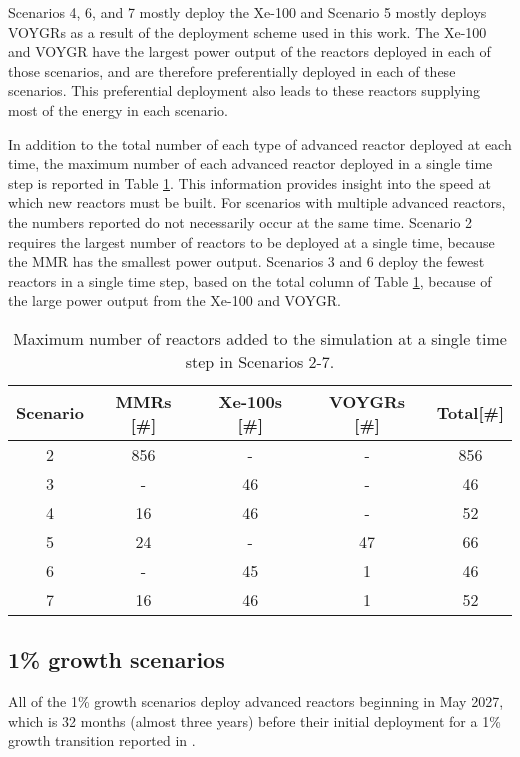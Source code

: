 Scenarios 4, 6, and 7 mostly deploy the Xe-100 and Scenario 5 mostly deploys 
VOYGRs as a result of the deployment scheme used in this work. The Xe-100 and 
VOYGR have the largest power output of the reactors deployed in each of those 
scenarios, and are therefore preferentially deployed in each of these scenarios.
This preferential deployment also leads to these reactors supplying most of 
the energy in each scenario.  

In addition to the total number of each type of advanced reactor deployed 
at each time, the maximum number of each advanced reactor deployed in a 
single time step is reported in Table 
\ref{tab:reactors_added_nogrowth}. This information provides insight 
into the speed at which new reactors must be built. For scenarios with 
multiple advanced reactors, the numbers reported do not necessarily occur 
at the same time. Scenario 2 requires 
the largest number of reactors to be deployed at a single time, because 
the \gls{MMR} has the smallest power output. Scenarios 3 and 
6 deploy the fewest reactors in 
a single time step, based on the total column of Table 
\ref{tab:reactors_added_nogrowth}, because of the large power output from 
the Xe-100 and VOYGR. 

\begin{table}[h!]
    \centering 
    \caption{Maximum number of reactors added to the simulation at a 
    single time step in Scenarios 2-7.}
    \label{tab:reactors_added_nogrowth}
    \begin{tabular}{c c c c c}
        \hline
        Scenario & \glspl{MMR} [\#]& Xe-100s [\#]& VOYGRs [\#]
        & Total[\#]\\\hline
        2 & 856 & - & - & 856\\
        3 & - & 46 & - & 46\\
        4 & 16 & 46 & - & 52\\
        5 & 24 & - & 47 & 66\\
        6 & - & 45 & 1 & 46\\
        7 & 16 & 46 & 1 & 52\\
        \hline
    \end{tabular}
\end{table}

\subsection{1\% growth scenarios} \label{sec:1percent_reactors}
All of the 1\% growth scenarios deploy advanced reactors beginning 
in May 2027, which is 32 months (almost three years) before their initial 
deployment for a 1\% growth transition reported in 
\cite{bachmann_enrichment_2021}.

